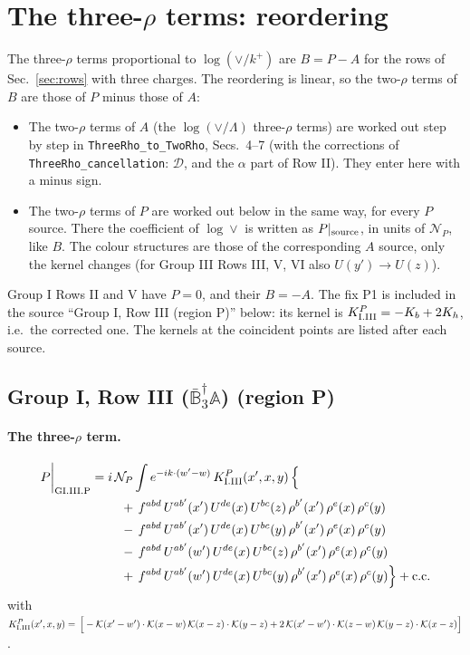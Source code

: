 \documentclass[10pt]{article}
\numberwithin{equation}{section}
\newcommand{\KK}{\mathcal K}
\newcommand{\NP}{\mathcal N_{P}}
\begin{document}
\section{The three-\texorpdfstring{$\rho$}{rho} terms: reordering}\label{sec:reorder}
The three-$\rho$ terms proportional to $\log(\vee/k^+)$ are $B=P-A$ for the rows of Sec.~\ref{sec:rows} with three charges. The reordering is linear, so the two-$\rho$ terms of $B$ are those of $P$ minus those of $A$:
\begin{itemize}
\item The two-$\rho$ terms of $A$ (the $\log(\vee/\Lambda)$ three-$\rho$ terms) are worked out step by step in \texttt{ThreeRho\_to\_TwoRho}, Secs.~4--7 (with the corrections of \texttt{ThreeRho\_cancellation}: $\mathcal D$, and the $\alpha$ part of Row II). They enter here with a minus sign.
\item The two-$\rho$ terms of $P$ are worked out below in the same way, for every $P$ source. There the coefficient of $\log\vee$ is written as $P|_{\rm source}$, in units of $\NP$, like $B$. The colour structures are those of the corresponding $A$ source, only the kernel changes (for Group III Rows III, V, VI also $U(y')\to U(z)$).
\end{itemize}
Group I Rows II and V have $P=0$, and their $B=-A$. The fix P1 is included in the source ``Group I, Row III (region P)'' below: its kernel is $K^{P}_{\rm I.III}=-K_b+2K_h$, i.e.\ the corrected one. The kernels at the coincident points are listed after each source.

\subsection{Group I, Row III ($\bar{\mathbb B}_3^\dagger\mathbb A$) (region P)}\label{sec:GI.III.P}

\paragraph{The three-$\rho$ term.}
\begin{align}
P\bigg|_{\rm GI.III.P}={}&i\,\NP\int e^{-ik\cdot(w'-w)}\,K^{P}_{\rm I.III}(x',x,y)\,\Big\{\notag\\
&\quad +\,f^{abd}\,U^{ab'}(x')\,U^{de}(x)\,U^{bc}(z)\,\rho^{b'}(x')\,\rho^{e}(x)\,\rho^{c}(y)\notag\\
&\quad -\,f^{abd}\,U^{ab'}(x')\,U^{de}(x)\,U^{bc}(y)\,\rho^{b'}(x')\,\rho^{e}(x)\,\rho^{c}(y)\notag\\
&\quad -\,f^{abd}\,U^{ab'}(w')\,U^{de}(x)\,U^{bc}(z)\,\rho^{b'}(x')\,\rho^{e}(x)\,\rho^{c}(y)\notag\\
&\quad +\,f^{abd}\,U^{ab'}(w')\,U^{de}(x)\,U^{bc}(y)\,\rho^{b'}(x')\,\rho^{e}(x)\,\rho^{c}(y)\Big\}+{\rm c.c.}\label{eq:in-GI.III.P}
\end{align}
with $K^{P}_{\rm I.III}(x',x,y)=\,\Big[-\KK(x'-w')\cdot\KK(x-w)\,\KK(x-z)\cdot\KK(y-z)+2\,\KK(x'-w')\cdot\KK(z-w)\,\KK(y-z)\cdot\KK(x-z)\Big]$.
\end{document}

